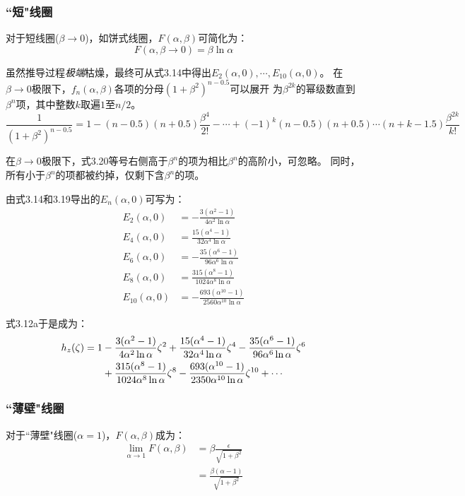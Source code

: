 \subsubsection{``短"线圈}
对于短线圈($\beta\rightarrow 0 $)，如饼式线圈，$F(\alpha,\beta)$可简化为：
\begin{equation}
  F(\alpha,\beta\rightarrow 0)=\beta \ln\alpha
\end{equation}

虽然推导过程\textit{极端}枯燥，最终可从式3.14中得出$E_2(\alpha,0),\cdots,E_{10}(\alpha,0)$。
在$\beta\rightarrow 0$极限下，$f_n(\alpha,\beta)$各项的分母$(1+\beta^2)^{n-0.5}$可以展开
为$\beta^{2k}$的幂级数直到$\beta^n$项，其中整数$k$取遍$1$至$n/2$。
\begin{equation}
 \frac{1}{(1+\beta^2)^{n-0.5}}=1-(n-0.5)(n+0.5)\frac{\beta^4}{2!}-\cdots+(-1)^k (n-0.5)(n+0.5)\cdots(n+k-1.5)\frac{\beta^{2k}}{k!}
\end{equation}

在$\beta\rightarrow 0$极限下，式3.20等号右侧高于$\beta^n$的项为相比$\beta^n$的高阶小，可忽略。
同时，所有小于$\beta^n$的项都被约掉，仅剩下含$\beta^n$的项。

由式3.14和3.19导出的$E_n(\alpha,0)$可写为：
\begin{subequations}
	\begin{align}
  E_2(\alpha,0) &= -\frac{3(\alpha^2-1)}{4\alpha^2 \ln \alpha} \\ 
  E_4(\alpha,0) &= \frac{15(\alpha^4-1)}{32\alpha^4 \ln \alpha} \\ 
  E_6(\alpha,0) &= -\frac{35(\alpha^6-1)}{96\alpha^6\ln \alpha} \\ 
  E_8(\alpha,0) &= \frac{315(\alpha^8-1)}{1024\alpha^8 \ln \alpha} \\
    E_{10}(\alpha,0) &= -\frac{693(\alpha^{10}-1)}{2560\alpha^{10} \ln \alpha}
    \end{align}
\end{subequations}

式3.12a于是成为：
\begin{align}
  h_z(\zeta)=1&-\frac{3(\alpha^2-1)}{4\alpha^2 \ln \alpha}\zeta^2+\frac{15(\alpha^4-1)}{32\alpha^4 \ln \alpha}\zeta^4 -\frac{35(\alpha^6-1)}{96\alpha^6\ln \alpha}\zeta^6\\\notag
  &+\frac{315(\alpha^8-1)}{1024\alpha^8\ln \alpha}\zeta^8-\frac{693(\alpha^{10}-1)}{2350\alpha^{10}\ln \alpha}\zeta^{10}+\cdots
\end{align}

\subsubsection{``薄壁"线圈}
对于``薄壁"线圈($\alpha=1$)，$F(\alpha,\beta)$成为：
\begin{subequations}
\begin{align}
  \lim_{\alpha\rightarrow 1} F(\alpha,\beta)&=\beta\frac{\epsilon}{\sqrt{1+\beta^2}}\\
  &=\frac{\beta(\alpha-1)}{\sqrt{1+\beta^2}}
\end{align}
\end{subequations}

